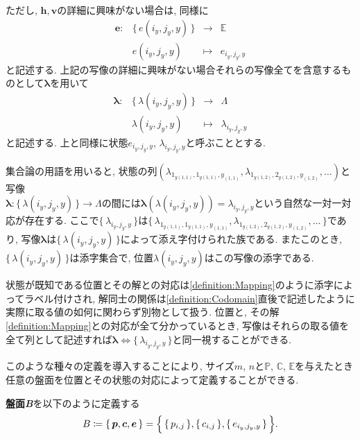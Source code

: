 \begin{definition}[写像$\bm{p}$, $\bm{c}$, $\bm{h}$, $\bm{v}$]
  ただし, $\bm{h},\bm{v}$の詳細に興味がない場合は, 同様に
  \begin{equation}
    \begin{array}{rccc}
      \bm{e}\colon & \{\,e(i_y,j_y,y)\,\} & \longrightarrow & \mathbb{E}    \\
                   & e(i_y,j_y,y)         & \longmapsto     & e_{i_y,j_y,y}
    \end{array}
  \end{equation}
  と記述する. 上記の写像の詳細に興味がない場合それらの写像全てを含意するものとして$\bm{\lambda}$を用いて
  \begin{equation}
    \begin{array}{rccc}
      \bm{\lambda}\colon & \{\,\lambda(i_y,j_y,y)\,\} & \longrightarrow & \Lambda             \\
                         & \lambda(i_y,j_y,y)         & \longmapsto     & \lambda_{i_y,j_y,y}
    \end{array}
  \end{equation}
  と記述する. 上と同様に状態$e_{i_y,j_y,y}$, $\lambda_{i_y,j_y,y}$と呼ぶこととする.
\end{definition}
集合論の用語を用いると, 状態の列$(\lambda_{1_{y(1,1)},1_{y(1,1)},y_{(1,1)}}, \lambda_{1_{y(1,2)},2_{y(1,2)},y_{(1,2)}},\ldots)$と写像\\
$\bm{\lambda}\colon \{\,\lambda(i_y,j_y,y)\,\} \longrightarrow \Lambda$の間には$\bm{\lambda}(\lambda(i_y,j_y,y))=\lambda_{i_y,j_y,y}$という自然な一対一対応が存在する.
ここで$\{\,\lambda_{i_y,j_y,y}\,\}$は$\{\,\lambda_{1_{y(1,1)},1_{y(1,1)},y_{(1,1)}}, \lambda_{1_{y(1,2)},2_{y(1,2)},y_{(1,2)}},\ldots\,\}$であり, 写像$\bm{\lambda}$は$\{\,\lambda(i_y,j_y,y)\,\}$によって添え字付けられた族である. またこのとき, $\{\,\lambda(i_y,j_y,y)\,\}$は添字集合で, 位置$\lambda(i_y,j_y,y)$はこの写像の添字である.

状態が既知である位置とその解との対応は\cref{definition:Mapping}のように添字によってラベル付けされ, 解同士の関係は\cref{definition:Codomain}直後で記述したように実際に取る値の如何に関わらず別物として扱う.
位置と, その解\cref{definition:Mapping}との対応が全て分かっているとき, 写像はそれらの取る値を全て列として記述すれば$\bm{\lambda}\Leftrightarrow \{\,\lambda_{i_y,j_y,y}\,\}$と同一視することができる.

このような種々の定義を導入することにより, サイズ$m$, $n$と$\mathbb{P}$, $\mathbb{C}$, $\mathbb{E}$を与えたとき任意の盤面を位置とその状態の対応によって定義することができる.
\begin{definition}[盤面\textit{B}]\label{definition:B}
  \textbf{盤面\textit{B}}を以下のように定義する
  \begin{equation}
    B\coloneqq \{\,\bm{p},\bm{c},\bm{e}\,\}=\Bigl\{\,\{\,p_{i,j}\,\},\{\,c_{i,j}\,\},\{\,e_{i_y,j_y,y}\,\}\,\Bigr\}.
  \end{equation}
\end{definition}

